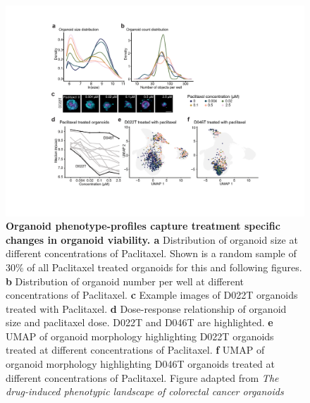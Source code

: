 \begin{flushleft}
\begin{figure}[h]
\centering
\includegraphics[width=\textwidth,
                height=\textheight,
                keepaspectratio]{figures/promise/pdf/fig_2_2.pdf}
\caption[Organoid phenotype-profiles capture treatment specific changes in organoid viability]{\textbf{Organoid phenotype-profiles capture treatment specific changes in organoid viability. a} Distribution of organoid size at different concentrations of Paclitaxel. Shown is a random sample of 30\% of all Paclitaxel treated organoids for this and following figures. \textbf{b} Distribution of organoid number per well at different concentrations of Paclitaxel. \textbf{c} Example images of D022T organoids treated with Paclitaxel. \textbf{d} Dose-response relationship of organoid size and paclitaxel dose. D022T and D046T are highlighted. \textbf{e} UMAP of organoid morphology highlighting D022T organoids treated at different concentrations of Paclitaxel. \textbf{f} UMAP of organoid morphology highlighting D046T organoids treated at different concentrations of Paclitaxel. Figure adapted from \textit{The drug-induced phenotypic landscape of colorectal cancer organoids} \parencite{betgeDruginducedPhenotypicLandscape2022}}
\label{fig_222}
\end{figure}
\bigbreak



\end{flushleft}
